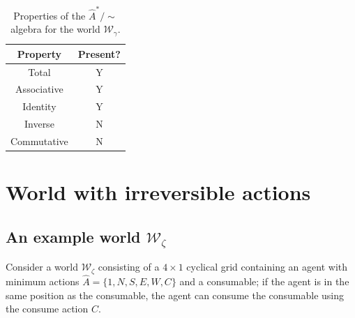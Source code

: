 \begin{table}[H]
    \centering
    \begin{tabular}{cc}
        \hline
        \textbf{Property}   & \textbf{Present?} \\
        \hline
        Total               & Y\\
        Associative         & Y\\
        Identity            & Y\\
        Inverse             & N\\
        \hline
        Commutative         & N
    \end{tabular}
    \caption{
    Properties of the $\hat{A}^{*}/\sim$ algebra for the world $\mathscr{W}_{\gamma}$.
    }
\end{table}


\section{World with irreversible actions}

\subsection{
An example world \texorpdfstring{$\mathscr{W}_{\zeta}$}{}
}

Consider a world $\mathscr{W}_{\zeta}$ consisting of a $4 \times 1$ cyclical grid containing an agent with minimum actions $\hat{A} = \{1, N, S, E, W, C\}$ and a consumable; if the agent is in the same position as the consumable, the agent can consume the consumable using the consume action $C$.

